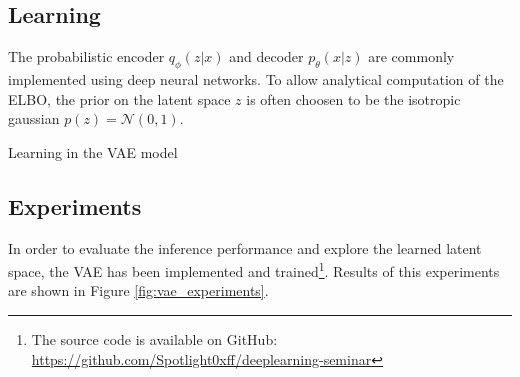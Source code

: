 \newpage

\subsection{Learning}
\label{sub:vae_learning}
The probabilistic encoder $q_\phi(z|x)$ and decoder $p_\theta(x|z)$ are commonly implemented using deep neural networks.
To allow analytical computation of the ELBO, the prior on the latent space $z$ is often choosen to be the isotropic gaussian $p(z) = \mathcal{N}(0,1)$.



\begin{algorithm}
  \caption{Learning in the VAE model}
  \label{alg:vae}
  \begin{algorithmic}[1]
    \EndWhile
  \end{algorithmic}
\end{algorithm}

\subsection{Experiments}
In order to evaluate the inference performance and explore the learned latent space, the VAE has been implemented and trained\footnote{The source code is available on GitHub: \url{https://github.com/Spotlight0xff/deeplearning-seminar}}. Results of this experiments are shown in Figure \ref{fig:vae_experiments}.






